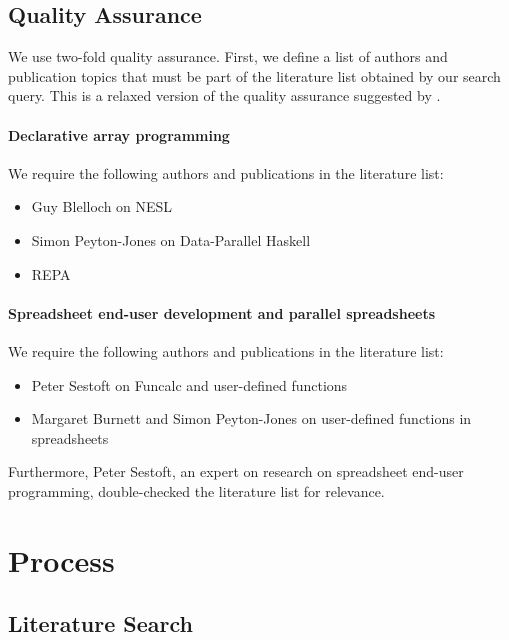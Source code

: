 \documentclass[a4paper]{article}
\begin{document}
\subsection{Quality Assurance}
\label{sec:quality-assurance}

We use two-fold quality assurance. First, we define a list of authors and publication topics that must be part of the literature list obtained by our search query. This is a relaxed version of the quality assurance suggested by \citet{keele2007guidelines}.

\paragraph{Declarative array programming}

We require the following authors and publications in the literature list:

\begin{itemize}
\item Guy Blelloch on NESL
\item Simon Peyton-Jones on Data-Parallel Haskell
\item REPA
\end{itemize}

\paragraph{Spreadsheet end-user development and parallel spreadsheets}

We require the following authors and publications in the literature list:

\begin{itemize}
\item Peter Sestoft on Funcalc and user-defined functions
\item Margaret Burnett and Simon Peyton-Jones on user-defined
  functions in spreadsheets
\end{itemize}

Furthermore, Peter Sestoft, an expert on research on spreadsheet end-user programming, double-checked the literature list for relevance.

\section{Process}
\label{sec:process}

\subsection{Literature Search}
\label{sec:literature-search}
\end{document}
